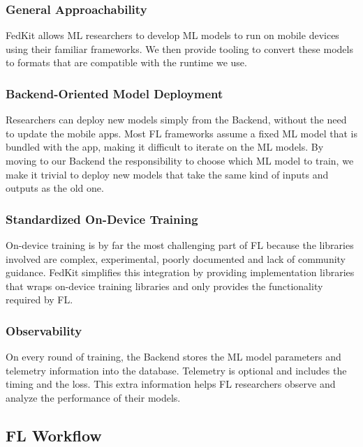 \documentclass[letterpaper]{article} %
\begin{document}
\subsubsection{General Approachability}
FedKit allows ML researchers to develop ML models to run on mobile devices
using their familiar frameworks.
We then provide tooling to convert these models to formats that are compatible
with the runtime we use.

\subsubsection{Backend-Oriented Model Deployment}
Researchers can deploy new models simply from the Backend,
without the need to update the mobile apps.
Most FL frameworks assume a fixed ML model that is bundled with the app,
making it difficult to iterate on the ML models.
By moving to our Backend the responsibility to choose which ML model to train,
we make it trivial to deploy new models that take the same kind of inputs and
outputs as the old one.

\subsubsection{Standardized On-Device Training}
On-device training is by far the most challenging part of FL because
the libraries involved are complex, experimental, poorly documented
and lack of community guidance.
FedKit simplifies this integration by providing implementation libraries
that wraps on-device training libraries and
only provides the functionality required by FL.

\subsubsection{Observability}
On every round of training, the Backend stores the ML model parameters and
telemetry information into the database.
Telemetry is optional and includes the timing and the loss.
This extra information helps FL researchers observe and analyze
the performance of their models.

\subsection{FL Workflow}
\end{document}

